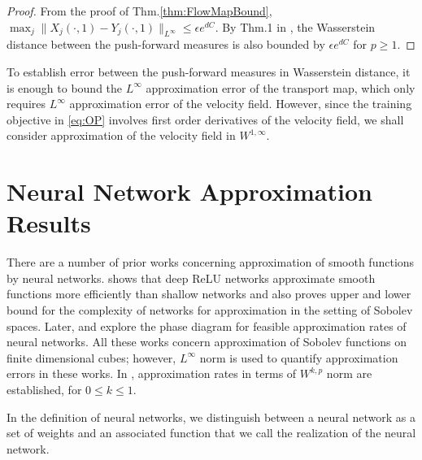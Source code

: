\begin{proof}
From the proof of Thm.\ref{thm:FlowMapBound}, $\max_j \|X_j(\cdot, 1) - Y_j(\cdot, 1)\|_{L^\infty}\leq \epsilon e^{dC}$. By Thm.1 in \cite{Wassersteinbound}, the Wasserstein distance between the push-forward measures is also bounded by $\epsilon e^{dC}$ for $p \geq 1$. 
\end{proof}
\begin{remark}
To establish error between the push-forward measures in Wasserstein distance, it is enough to bound the $L^\infty$ approximation error of the transport map, which only requires $L^\infty$ approximation error of the velocity field. However, since the training objective in \ref{eq:OP} involves first order derivatives of the velocity field, we shall consider approximation of the velocity field in $W^{1, \infty}$. 
\end{remark}







\section{Neural Network Approximation Results}

There are a number of prior works concerning approximation of smooth functions by neural networks. \cite{NNApproximation1} shows that deep ReLU networks approximate smooth functions more efficiently than shallow networks and also proves upper and lower bound for the complexity of networks for approximation in the setting of Sobolev spaces. Later, \cite{NNApproximation3} and \cite{NNApproximation4} explore the phase diagram for feasible approximation rates of neural networks. All these works concern approximation of Sobolev functions on finite dimensional cubes; however, $L^\infty$ norm is used to quantify approximation errors in these works. In \cite{NNApproximation2}, approximation rates in terms of $W^{k,p}$ norm are established, for $0\leq k\leq 1$. 


In the definition of neural networks, we distinguish between a neural network as a set of weights and an associated function that we call the realization of the neural network.

